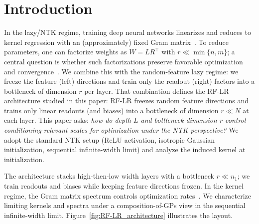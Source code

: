 
\section{Introduction}
In the lazy/NTK regime, training deep neural networks linearizes and reduces to kernel regression with an (approximately) fixed Gram matrix~\cite{jacot2018neural}. To reduce parameters, one can factorize weights as \(W=LR^\top\) with \(r\ll\min\{n,m\}\); a central question is whether such factorizations preserve favorable optimization and convergence~\cite{zhang2025structuredbalancedmulticomponentmultilayer}. We combine this with the random-feature lazy regime: we freeze the feature (left) directions and train only the readout (right) factors into a bottleneck of dimension \(r\) per layer. That combination defines the RF-LR architecture studied in this paper: RF-LR freezes random feature directions and trains only linear readouts (and biases) into a bottleneck of dimension \(r\ll N\) at each layer. This paper asks: \emph{how do depth \(L\) and bottleneck dimension \(r\) control conditioning-relevant scales for optimization under the NTK perspective?} We adopt the standard NTK setup (ReLU activation, isotropic Gaussian initialization, sequential infinite-width limit) and analyze the induced kernel at initialization.

The architecture stacks high-then-low width layers with a bottleneck \(r\ll n_1\); we train readouts and biases while keeping feature directions frozen. In the kernel regime, the Gram matrix spectrum controls optimization rates~\cite{jacot2018neural,cao2020understandingspectralbiasdeep}. We characterize limiting kernels and spectra under a composition-of-GPs view in the sequential infinite-width limit. Figure~\ref{fig:RF-LR_architecture} illustrates the layout.

